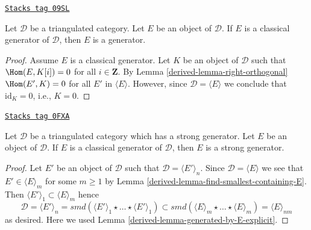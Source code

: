 \begin{lemma}
\label{derived-lemma-classical-generator-generator}
\href{https://stacks.math.columbia.edu/tag/09SL}{\texttt{Stacks tag 09SL}}

Let $\mathcal{D}$ be a triangulated category. Let $E$ be an object
of $\mathcal{D}$. If $E$ is a classical generator of $\mathcal{D}$,
then $E$ is a generator.
\end{lemma}

\begin{proof}

Assume $E$ is a classical generator. Let $K$ be an object of $\mathcal{D}$
such that $\Hom(E, K[i]) = 0$ for all $i \in \mathbf{Z}$. By
Lemma \ref{derived-lemma-right-orthogonal}
$\Hom(E', K) = 0$ for all $E'$ in $\langle E \rangle$. However, since
$\mathcal{D} = \langle E \rangle$ we conclude that $\text{id}_K = 0$,
i.e., $K = 0$.
\end{proof}

\begin{lemma}
\label{derived-lemma-classical-generator-strong-generator}
\href{https://stacks.math.columbia.edu/tag/0FXA}{\texttt{Stacks tag 0FXA}}

Let $\mathcal{D}$ be a triangulated category which has a strong generator.
Let $E$ be an object of $\mathcal{D}$. If $E$ is a classical generator of
$\mathcal{D}$, then $E$ is a strong generator.
\end{lemma}

\begin{proof}

Let $E'$ be an object of $\mathcal{D}$ such that
$\mathcal{D} = \langle E' \rangle_n$. Since
$\mathcal{D} = \langle E \rangle$ we see that $E' \in \langle E \rangle_m$
for some $m \geq 1$ by Lemma \ref{derived-lemma-find-smallest-containing-E}.
Then $\langle E' \rangle_1 \subset \langle E \rangle_m$ hence
$$
\mathcal{D} =
\langle E' \rangle_n = smd(
\langle E' \rangle_1 \star \ldots \star \langle E' \rangle_1)
\subset
smd(
\langle E \rangle_m \star \ldots \star \langle E \rangle_m)
=
\langle E \rangle_{nm}
$$
as desired. Here we used Lemma \ref{derived-lemma-generated-by-E-explicit}.
\end{proof}

